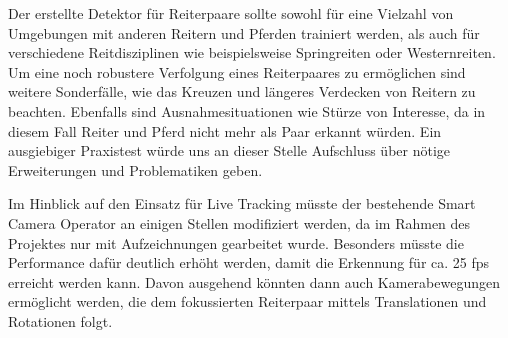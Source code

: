 Der erstellte Detektor für Reiterpaare sollte sowohl für eine Vielzahl von Umgebungen mit anderen Reitern und Pferden trainiert werden, als auch für verschiedene Reitdisziplinen wie beispielsweise Springreiten oder Westernreiten. 
Um eine noch robustere Verfolgung eines Reiterpaares zu ermöglichen sind weitere Sonderfälle, wie das Kreuzen und längeres Verdecken von Reitern zu beachten. Ebenfalls sind Ausnahmesituationen wie Stürze von Interesse, da in diesem Fall Reiter und Pferd nicht mehr als Paar erkannt würden.
Ein ausgiebiger Praxistest würde uns an dieser Stelle Aufschluss über nötige Erweiterungen und Problematiken geben.

Im Hinblick auf den Einsatz für Live Tracking müsste der bestehende Smart Camera Operator an einigen Stellen modifiziert werden, da im Rahmen des Projektes nur mit Aufzeichnungen gearbeitet wurde. Besonders müsste die Performance dafür deutlich erhöht werden, damit die Erkennung für ca. 25 fps erreicht werden kann. Davon ausgehend könnten dann auch Kamerabewegungen ermöglicht werden, die dem fokussierten Reiterpaar mittels Translationen und Rotationen folgt.

